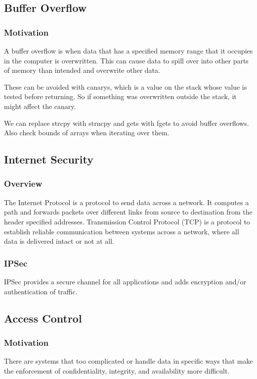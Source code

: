 \documentclass[11pt]{article}
\begin{document}
\subsection{Buffer Overflow}
\subsubsection{Motivation}
A buffer overflow is when data that has a specified memory range that it occupies in the computer is overwritten.
This can cause data to spill over into other parts of memory than intended and overwrite other data.

These can be avoided with canarys, which is a value on the stack whose value is tested before returning.
So if something was overwritten outside the stack, it might affect the canary.

We can replace strcpy with strncpy and gets with fgets to avoid buffer overflows.
Also check bounds of arrays when iterating over them.

\subsection{Internet Security}
\subsubsection{Overview}
The Internet Protocol is a protocol to send data across a network. 
It computes a path and forwards packets over different links from source to destination from the header specified addresses.
Transmission Control Protocol (TCP) is a protocol to establish reliable communication between systems across a network, where all data is delivered intact or not at all.

\subsubsection{IPSec}
IPSec provides a secure channel for all applications and adds encryption and/or authentication of traffic.

\subsection{Access Control}

\subsubsection{Motivation}
There are systems that too complicated or handle data in specific ways that make the enforcement of confidentiality, integrity, and availability more difficult.
\end{document}
